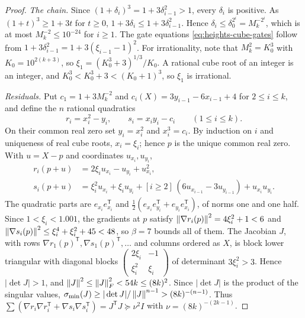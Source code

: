 \begin{proof}
\emph{The chain.} Since $(1+\delta_i)^3=1+3\delta_{i-1}^2>1$, every
$\delta_i$ is positive. As $(1+t)^3\ge1+3t$ for $t\ge0$,
$1+3\delta_i\le1+3\delta_{i-1}^2$. Hence
$\delta_i\le\delta_0^{2^i}=M_k^{-2^i}$, which is at most
$M_k^{-2}\le10^{-24}$ for $i\ge1$. The gate equations
\eqref{eq:heights-cube-gates} follow from
$1+3\delta_{i-1}^2=1+3(\xi_{i-1}-1)^2$. For irrationality, note that
$M_k^2=K_0^3$ with $K_0=10^{2(k+3)}$, so $\xi_1=(K_0^3+3)^{1/3}/K_0$. A rational
cube root of an integer is an integer, and $K_0^3<K_0^3+3<(K_0+1)^3$, so
$\xi_1$ is irrational.

\emph{Residuals.} Put $c_1=1+3M_k^{-2}$ and
$c_i(X)=3y_{i-1}-6x_{i-1}+4$ for $2\le i\le k$, and define the $n$ rational
quadratics
\[
 r_i=x_i^2-y_i,\qquad s_i=x_iy_i-c_i\qquad(1\le i\le k).
\]
On their common real zero set $y_i=x_i^2$ and $x_i^3=c_i$. By induction on
$i$ and uniqueness of real cube roots, $x_i=\xi_i$; hence $p$ is the unique
common real zero. With $u=X-p$ and coordinates $u_{x_i},u_{y_i}$,
\begin{align*}
 r_i(p+u)&=2\xi_iu_{x_i}-u_{y_i}+u_{x_i}^2,\\
 s_i(p+u)&=\xi_i^2u_{x_i}+\xi_iu_{y_i}+[i\ge2]\,(6u_{x_{i-1}}-3u_{y_{i-1}})
          +u_{x_i}u_{y_i}.
\end{align*}
The quadratic parts are $e_{x_i}e_{x_i}^{\mathsf T}$ and
$\frac12(e_{x_i}e_{y_i}^{\mathsf T}+e_{y_i}e_{x_i}^{\mathsf T})$, of norms one and
one half. Since $1<\xi_i<1.001$, the gradients at $p$ satisfy
$\left\lVert\nabla r_i(p)\right\rVert^2=4\xi_i^2+1<6$ and
$\left\lVert\nabla s_i(p)\right\rVert^2\le\xi_i^4+\xi_i^2+45<48$, so $\beta=7$ bounds all of
them. The Jacobian $J$, with rows
$\nabla r_1(p)^{\mathsf T},\nabla s_1(p)^{\mathsf T},\ldots$ and columns ordered
as $X$, is block lower triangular with diagonal blocks
$\left(\begin{smallmatrix}2\xi_i&-1\\\xi_i^2&\xi_i\end{smallmatrix}\right)$ of
determinant $3\xi_i^2>3$. Hence $|\det J|>1$, and
$\left\lVert J\right\rVert^2\le\left\lVert J\right\rVert_F^2<54k\le(8k)^2$. Since $|\det J|$ is the product of the
singular values, $\sigma_{\min}(J)\ge|\det J|/\left\lVert J\right\rVert^{n-1}>(8k)^{-(n-1)}$.
Thus $\sum(\nabla r_i\nabla r_i^{\mathsf T}+\nabla s_i\nabla s_i^{\mathsf T})
=J^{\mathsf T}J\succeq\nu^2I$ with $\nu=(8k)^{-(2k-1)}$.


\end{proof}
